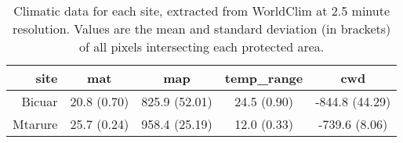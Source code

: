 \begin{table}[H]
\centering
\begin{tabular}{rcccc}
  \hline
site & mat & map & temp_range & cwd \\ 
  \hline
Bicuar & 20.8 (0.70) & 825.9 (52.01) & 24.5 (0.90) & -844.8 (44.29) \\ 
  Mtarure & 25.7 (0.24) & 958.4 (25.19) & 12.0 (0.33) & -739.6 (8.06) \\ 
   \hline
\end{tabular}
\caption{Climatic data for each site, extracted from WorldClim at 2.5 minute resolution. Values are the mean and standard deviation (in brackets) of all pixels intersecting each protected area.} 
\label{clim}
\end{table}

